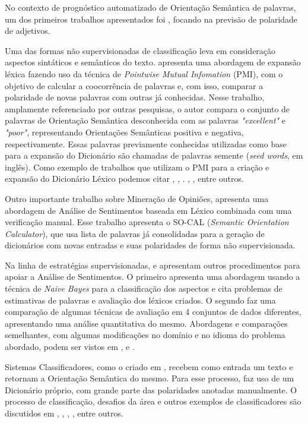 \documentclass[12pt]{article}
\begin{document}
No contexto de prognóstico automatizado de Orientação Semântica de palavras, um dos primeiros trabalhos apresentados foi \cite{Hatzivassiloglou}, focando na previsão de polaridade de adjetivos.

Uma das formas não supervisionadas de classificação leva em consideração aspectos sintáticos e semânticos do texto. \cite{Turney2002} apresenta uma abordagem de expansão léxica fazendo uso da técnica de \emph{Pointwise Mutual Infomation} (PMI), com o objetivo de calcular a coocorrência de palavras e, com isso, comparar a polaridade de novas palavras com outras já conhecidas. Nesse trabalho, amplamente referenciado por outras pesquisas, o autor compara o conjunto de palavras de Orientação Semântica desconhecida com as palavras \emph{ "excellent"} e \emph{"poor"}, representando Orientações Semânticas positiva e negativa, respectivamente. Essas palavras previamente conhecidas utilizadas como base para a expansão do Dicionário são chamadas de palavras semente (\emph{seed words}, em inglês). Como exemplo de trabalhos que utilizam o PMI para a criação e expansão do Dicionário Léxico podemos citar \cite{becker2013}, \cite{Zhou2014}, \cite{Pinto2007}. \cite{Pantel2006}, \cite{duwairi2015detecting}, entre outros.

Outro importante trabalho sobre Mineração de Opiniões, \cite{taboada2011lexicon} apresenta uma abordagem de Análise de Sentimentos baseada em Léxico combinada com uma verificação manual. Esse trabalho apresenta o SO-CAL (\emph{Semantic Orientation Calculator}), que usa lista de palavras já consolidadas para a geração de dicionários com novas entradas e suas polaridades de forma não supervisionada.

Na linha de estratégias supervisionadas, \cite{eisenstein2016unsupervised} e \cite{bandhakavi2016lexicon} apresentam outros procedimentos para apoiar a Análise de Sentimentos. O primeiro apresenta uma abordagem usando a técnica de \emph{Naive Bayes} para a classificação dos aspectos e cita problemas de estimativas de palavras e avaliação dos léxicos criados. O segundo faz uma comparação de algumas técnicas de avaliação em 4 conjuntos de dados diferentes, apresentando uma análise quantitativa do mesmo. Abordagens e comparações semelhantes, com algumas modificações no domínio e no idioma do problema abordado, podem ser vistos em \cite{khoo2017lexicon}, \cite{asghar2014review} e \cite{ding2008holistic}.

Sistemas Classificadores, como o criado em \cite{Rodrigues2016}, recebem como entrada um texto e retornam a Orientação Semântica do mesmo. Para esse processo, \cite{Rodrigues2016} faz uso de um Dicionário próprio, com grande parte das polaridades anotadas manualmente. O processo de classificação, desafios da área e outros exemplos de classificadores são discutidos em \cite{Pang2002}, \cite{Zhou2014}, \cite{silva2010automatic}, \cite{kdir16}, entre outros.
\end{document}
